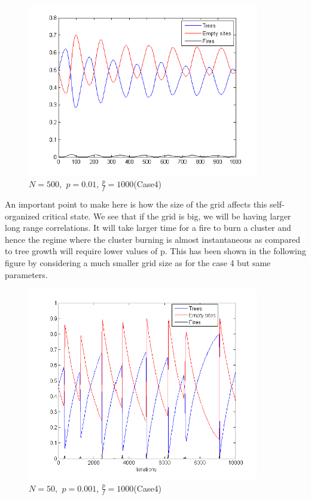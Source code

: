\documentclass[11pt]{article}
\begin{document}
\begin{figure}[H]
\centering
\includegraphics[width=0.9\textwidth,keepaspectratio=true,]{Pictures/case4_size500_10000iter_p_0point01_ratio_1000.png}
\caption{$N=500$, $\ p=0.01$, $\frac{p}{f}=1000$(Case4)}
\end{figure}



An important point to make here is how the size of the grid affects this self-organized critical state. We see that if the grid is big, we will be having larger long range correlations. It will take larger time for a fire to burn a cluster and hence the regime where the cluster burning is almost instantaneous as compared to tree growth will require lower values of p.
This has been shown in the following figure by considering a much smaller grid size as for the case 4 but same parameters.
\begin{figure}[H]
\centering
\includegraphics[width=0.9\textwidth,keepaspectratio=true,]{Pictures/case4_size50_10000iter_p_0point001_ratio_1000.png}
\caption{$N=50$, $\ p=0.001$, $\frac{p}{f}=1000$(Case4)}
\end{figure}
\end{document}
